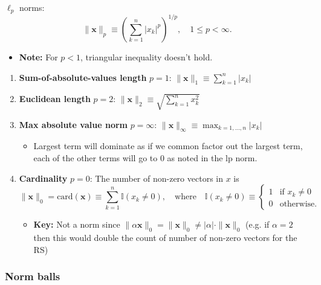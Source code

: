 \begin{example}
    $\ell_p$ norms:
    \[
    \| \mathbf{x} \|_p \equiv \left( \sum_{k=1}^{n} |x_k|^p \right)^{1/p}, \quad 1 \leq p < \infty.
    \]
    \begin{itemize}
        \item \textbf{Note:} For $p<1$, triangular inequality doesn't hold.
    \end{itemize}
    \begin{enumerate}
        \item \textbf{Sum-of-absolute-values length} $p=1$: $\| \mathbf{x} \|_1 \equiv \sum_{k=1}^{n} |x_k|$
        \item \textbf{Euclidean length} $p=2$: $\| \mathbf{x} \|_2 \equiv \sqrt{\sum_{k=1}^{n} x_k^2}$
        \item \textbf{Max absolute value norm} $p=\infty$: $\| \mathbf{x} \|_\infty \equiv \max_{k=1,\ldots,n} |x_k|$
        \begin{itemize}
            \item Largest term will dominate as if we common factor out the largest term, each of the other terms will go to 0 as noted in the lp norm.
        \end{itemize}
        \item \textbf{Cardinality} $p=0$: The number of non-zero vectors in $x$ is 
                \[
                    \| \mathbf{x} \|_0 = \text{card}(\mathbf{x}) \equiv \sum_{k=1}^{n} \mathbb{I}(x_k \neq 0), \quad \text{where} \quad \mathbb{I}(x_k \neq 0) \equiv 
                \begin{cases}
                1 & \text{if } x_k \neq 0 \\
                0 & \text{otherwise}.
                \end{cases}
                \]
        \begin{itemize}
            \item \textbf{Key:} Not a norm since $ \|\alpha \mathbf{x}\|_0 = \|\mathbf{x}\|_0 \neq |\alpha| \cdot \|\mathbf{x}\|_0$ (e.g. if $\alpha=2$ then this would double the count of number of non-zero vectors for the RS)
        \end{itemize}
    \end{enumerate}
\end{example}

    \subsubsection{Norm balls}

